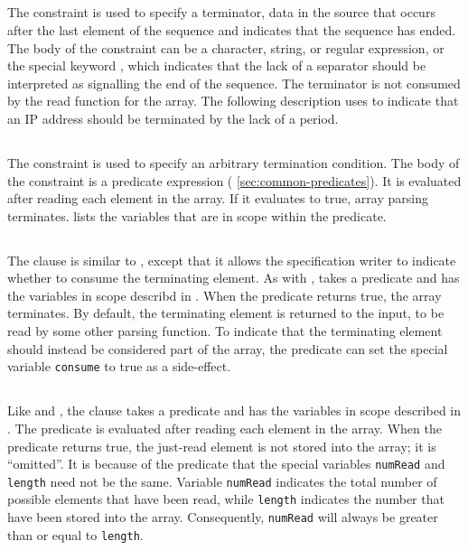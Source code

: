 \subsection{\Pterm}
The \Pterm{} constraint is used to specify a terminator, \ie{} data in
the source that occurs after the last element of the sequence and
indicates that the sequence has ended.  The body of the \Pterm{}
constraint can be a character, string, or regular expression, or the
special keyword \Pnosep{}, which indicates that the lack of a
separator should be interpreted as signalling the end of the
sequence.   The terminator is not consumed by the read function for
the array.  The following description uses \Pnosep{} to indicate that
an IP address should be terminated by the lack of a period.


\subsection{\Plast}
The \Plast{} constraint is used to specify an arbitrary termination
condition.  The body of the constraint is a predicate expression (\cf{}
\ref{sec:common-predicates}).  It is evaluated after reading each
element in the array.  If it evaluates to true, array parsing
terminates.  lists the variables that
are in scope within the predicate.

\subsection{\Pended}
The \Pended{} clause is similar to \Plast{}, except that it allows 
the specification writer to indicate whether to consume the terminating
element.   As with \Plast{}, \Pended takes a predicate and has the
variables in scope describd in .  When the
predicate returns true, the array terminates.  By default, the
terminating element is returned to the input, to be read by some other
parsing function.  To indicate that the terminating element should
instead be considered part of the array, the predicate can set the
special variable \texttt{consume} to true as a side-effect.

\subsection{\Pomit}
Like \Plast{} and \Pended{}, the \Pomit{} clause takes a predicate and
has the variables in scope described in
. 
The predicate is evaluated after reading each element in the array.
When the predicate returns true, the just-read element is not stored
into the array;  it is ``omitted''.  It is because of the \Pomit{}
predicate that the special variables \texttt{numRead} and
\texttt{length} need not be the same.  Variable \texttt{numRead}
indicates the total number of possible elements that have been read,
while \texttt{length} indicates the number that have been stored into
the array.  Consequently, \texttt{numRead} will always be greater than
or equal to \texttt{length}.


